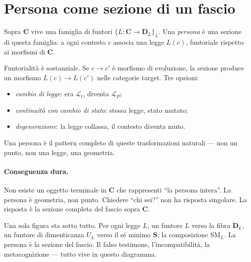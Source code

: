 \documentclass[
    oneside,                 %
    openany,                 %
    titlepage,
    11pt,
    a4paper,
    italian,
    DIV=14,                  %
    headinclude,
    footinclude=true,
    cleardoublepage=empty
]{scrbook}
\theoremstyle{ctplain}
\theoremstyle{ctdef}
\theoremstyle{ctrem}
\newcommand{\Lt}{\mathcal{L}_t}
\newcommand{\LP}{\mathcal{L}_P}
\begin{document}
\section*{Persona come sezione di un fascio}

Sopra $\mathbf{C}$ vive una famiglia di funtori $\{L : \mathbf{C} \to \mathbf{D}_L\}_L$. Una \emph{persona} è una sezione di questa famiglia: a ogni contesto $c$ associa una legge $L(c)$, funtoriale rispetto ai morfismi di $\mathbf{C}$.

Funtorialità è sostanziale. Se $c \to c'$ è morfismo di evoluzione, la sezione produce un morfismo $L(c) \to L(c')$ nelle categorie target. Tre opzioni:
\begin{itemize}
\item \emph{cambio di legge}: era $\Lt$, diventa $\LP$;
\item \emph{continuità con cambio di stato}: stessa legge, stato mutato;
\item \emph{degenerazione}: la legge collassa, il contesto diventa muto.
\end{itemize}
Una persona è il pattern completo di queste trasformazioni naturali --- non un punto, non una legge, una geometria.

\paragraph{Conseguenza dura.} Non esiste un oggetto terminale in $\mathbf{C}$ che rappresenti ``la persona intera''. La persona è geometria, non punto. Chiedere ``chi sei?'' non ha risposta singolare. La risposta è la sezione completa del fascio sopra $\mathbf{C}$.

\bigskip

\begin{center}
\end{center}

\bigskip

Una sola figura sta sotto tutto. Per ogni legge $L$, un funtore $L$ verso la fibra $\mathbf{D}_L$, un funtore di dimenticanza $U_L$ verso il sé minimo $\mathbf{S}$, la composizione $\mathrm{SM}_L$. La persona è la sezione del fascio. Il falso testimone, l'incompatibilità, la metacognizione --- tutto vive in questo diagramma.
\end{document}
